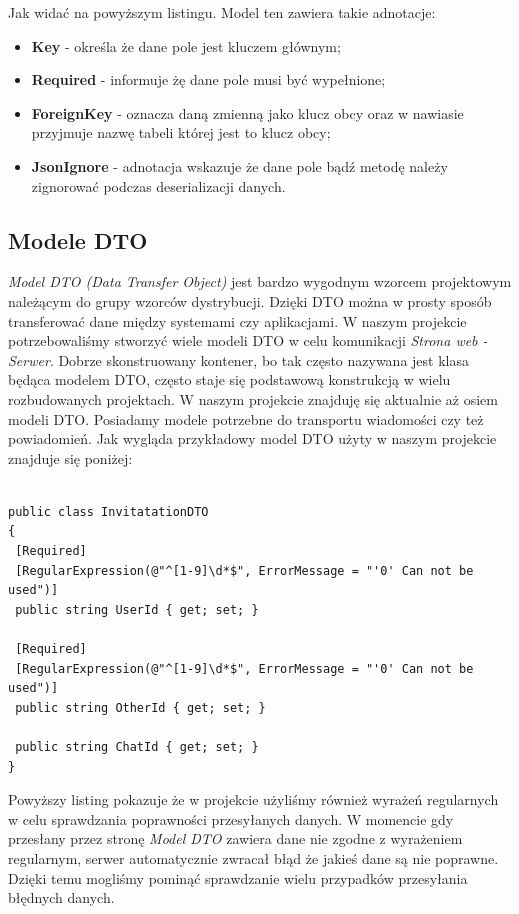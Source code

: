 \documentclass[12pt,a4paper]{article}
\begin{document}
\hspace*{0.7cm} Jak widać na powyższym listingu. Model ten zawiera takie adnotacje:
\begin{itemize}
	\item \textbf{Key} - określa że dane pole jest kluczem głównym;
	\item \textbf{Required} - informuje żę dane pole musi być wypełnione;
	\item \textbf{ForeignKey} - oznacza daną zmienną jako klucz obcy oraz w nawiasie przyjmuje nazwę tabeli której jest to klucz obcy;
	\item \textbf{JsonIgnore} - adnotacja wskazuje że dane pole bądź metodę należy zignorować podczas deserializacji danych.
\end{itemize}

\subsection{Modele DTO} 					%
\hspace*{0.7cm} \textit{Model DTO (Data Transfer Object)}  jest bardzo wygodnym wzorcem projektowym należącym do grupy wzorców dystrybucji. Dzięki DTO można w prosty sposób transferować dane między systemami czy aplikacjami. W naszym projekcie potrzebowaliśmy stworzyć wiele modeli DTO w celu komunikacji \textit{Strona web - Serwer}. Dobrze skonstruowany kontener, bo tak często nazywana jest klasa będąca modelem DTO, często staje się podstawową konstrukcją w wielu rozbudowanych projektach. W naszym projekcie znajduję się aktualnie aż osiem modeli DTO. Posiadamy modele potrzebne do transportu wiadomości czy też powiadomień. Jak wygląda przykładowy model DTO użyty w naszym projekcie znajduje się poniżej:\newline

\begin{lstlisting}[caption={Przykładowa klasa modelu DTO - Message}]

public class InvitatationDTO
{
 [Required]
 [RegularExpression(@"^[1-9]\d*$", ErrorMessage = "'0' Can not be used")]
 public string UserId { get; set; }
	
 [Required]
 [RegularExpression(@"^[1-9]\d*$", ErrorMessage = "'0' Can not be used")]
 public string OtherId { get; set; }
	
 public string ChatId { get; set; }
}
\end{lstlisting}

\hspace*{0.7cm} Powyższy listing pokazuje że w projekcie użyliśmy również wyrażeń regularnych w celu sprawdzania poprawności przesyłanych danych. W momencie gdy przesłany przez stronę \textit{Model DTO} zawiera dane nie zgodne z wyrażeniem regularnym, serwer automatycznie zwracał błąd że jakieś dane są nie poprawne. Dzięki temu mogliśmy pominąć sprawdzanie wielu przypadków przesyłania błędnych danych.
\end{document}
